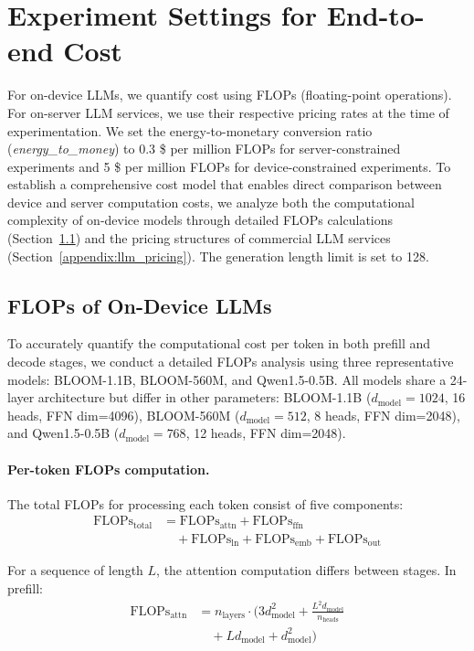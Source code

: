 \section{Experiment Settings for End-to-end Cost}
\label{appendix:unified_cost}

For on-device LLMs, we quantify cost using FLOPs (floating-point operations). For on-server LLM services, we use their respective pricing rates at the time of experimentation. We set the energy-to-monetary conversion ratio (\textit{energy\_to\_money}) to 0.3 \$ per million FLOPs for server-constrained experiments and 5 \$ per million FLOPs for device-constrained experiments. To establish a comprehensive cost model that enables direct comparison between device and server computation costs, we analyze both the computational complexity of on-device models through detailed FLOPs calculations (Section~\ref{sec:flops_analysis}) and the pricing structures of commercial LLM services (Section~\ref{appendix:llm_pricing}). The generation length limit is set to 128.


\subsection{FLOPs of On-Device LLMs}
\label{sec:flops_analysis}

To accurately quantify the computational cost per token in both prefill and decode stages, we conduct a detailed FLOPs analysis using three representative models: BLOOM-1.1B, BLOOM-560M, and Qwen1.5-0.5B. All models share a 24-layer architecture but differ in other parameters: BLOOM-1.1B ($d_{\text{model}}=1024$, 16 heads, FFN dim=4096), BLOOM-560M ($d_{\text{model}}=512$, 8 heads, FFN dim=2048), and Qwen1.5-0.5B ($d_{\text{model}}=768$, 12 heads, FFN dim=2048).

\paragraph{Per-token FLOPs computation.}
The total FLOPs for processing each token consist of five components:
\begin{align}
    \text{FLOPs}_{\text{total}} &= \text{FLOPs}_{\text{attn}} + \text{FLOPs}_{\text{ffn}} \nonumber \\
    &\quad+ \text{FLOPs}_{\text{ln}} + \text{FLOPs}_{\text{emb}} + \text{FLOPs}_{\text{out}}
\end{align}

For a sequence of length $L$, the attention computation differs between stages. In prefill:
\begin{align}
    \text{FLOPs}_{\text{attn}} &= n_{\text{layers}} \cdot \Big(3d_{\text{model}}^2 + \frac{L^2 d_{\text{model}}}{n_{\text{heads}}} \nonumber \\
    &\quad+ L d_{\text{model}} + d_{\text{model}}^2\Big)
\end{align}

